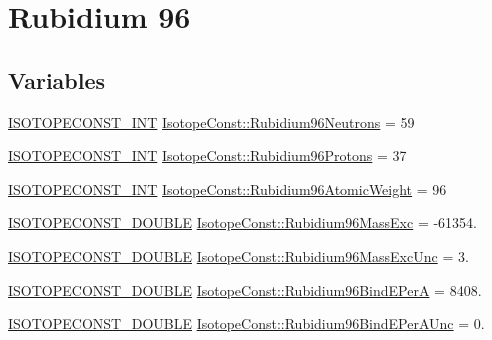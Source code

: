 \hypertarget{group___isotope_const-_rubidium-_rb96}{}\section{Rubidium 96}
\label{group___isotope_const-_rubidium-_rb96}
\subsection*{Variables}
\begin{DoxyCompactItemize}
\item 
\mbox{\hyperlink{group___isotope_const-_macros_ga5f18360b3e99483a35c32d789e62621c}{I\+S\+O\+T\+O\+P\+E\+C\+O\+N\+S\+T\+\_\+\+I\+NT}} \mbox{\hyperlink{group___isotope_const-_rubidium-_rb96_ga6d89f5052f10c9f831ee42ba255891f8}{Isotope\+Const\+::\+Rubidium96\+Neutrons}} = 59
\item 
\mbox{\hyperlink{group___isotope_const-_macros_ga5f18360b3e99483a35c32d789e62621c}{I\+S\+O\+T\+O\+P\+E\+C\+O\+N\+S\+T\+\_\+\+I\+NT}} \mbox{\hyperlink{group___isotope_const-_rubidium-_rb96_ga77cafe55cec52573ecf0b79ef4a9afe7}{Isotope\+Const\+::\+Rubidium96\+Protons}} = 37
\item 
\mbox{\hyperlink{group___isotope_const-_macros_ga5f18360b3e99483a35c32d789e62621c}{I\+S\+O\+T\+O\+P\+E\+C\+O\+N\+S\+T\+\_\+\+I\+NT}} \mbox{\hyperlink{group___isotope_const-_rubidium-_rb96_gaf6e26eac66918f9be2e5eb17493cef20}{Isotope\+Const\+::\+Rubidium96\+Atomic\+Weight}} = 96
\item 
\mbox{\hyperlink{group___isotope_const-_macros_ga8f45a7272ce02c0b4c65c44636ed719a}{I\+S\+O\+T\+O\+P\+E\+C\+O\+N\+S\+T\+\_\+\+D\+O\+U\+B\+LE}} \mbox{\hyperlink{group___isotope_const-_rubidium-_rb96_ga334fdcd2fd17a5af64eeaa0f69a79346}{Isotope\+Const\+::\+Rubidium96\+Mass\+Exc}} = -\/61354.
\item 
\mbox{\hyperlink{group___isotope_const-_macros_ga8f45a7272ce02c0b4c65c44636ed719a}{I\+S\+O\+T\+O\+P\+E\+C\+O\+N\+S\+T\+\_\+\+D\+O\+U\+B\+LE}} \mbox{\hyperlink{group___isotope_const-_rubidium-_rb96_ga2f674995046a0903bbb2c670170a4021}{Isotope\+Const\+::\+Rubidium96\+Mass\+Exc\+Unc}} = 3.
\item 
\mbox{\hyperlink{group___isotope_const-_macros_ga8f45a7272ce02c0b4c65c44636ed719a}{I\+S\+O\+T\+O\+P\+E\+C\+O\+N\+S\+T\+\_\+\+D\+O\+U\+B\+LE}} \mbox{\hyperlink{group___isotope_const-_rubidium-_rb96_gac0233fc6fd34524aac8eb94b68111b43}{Isotope\+Const\+::\+Rubidium96\+Bind\+E\+PerA}} = 8408.
\item 
\mbox{\hyperlink{group___isotope_const-_macros_ga8f45a7272ce02c0b4c65c44636ed719a}{I\+S\+O\+T\+O\+P\+E\+C\+O\+N\+S\+T\+\_\+\+D\+O\+U\+B\+LE}} \mbox{\hyperlink{group___isotope_const-_rubidium-_rb96_gad9fbd2fc71f4efb30abb223ba5c4ce17}{Isotope\+Const\+::\+Rubidium96\+Bind\+E\+Per\+A\+Unc}} = 0.

\end{DoxyCompactItemize}
